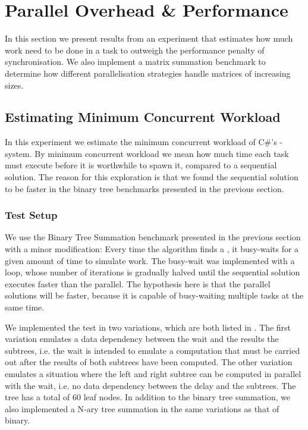 \section{Parallel Overhead \& Performance}\label{sec:crit:work}
In this section we present results from an experiment that estimates how much work need to be done in a task to outweigh the performance penalty of  synchronisation. We also implement a matrix summation benchmark to determine how different parallelisation strategies handle matrices of increasing sizes.

\subsection{Estimating Minimum Concurrent Workload}
In this experiment we estimate the minimum concurrent workload of C\#'s -system. By minimum concurrent workload we mean how much time each task must execute before it is worthwhile to spawn it, compared to a sequential solution. The reason for this exploration is that we found the sequential solution to be faster in the binary tree benchmarks presented in the previous section.

\subsubsection{Test Setup}
We use the Binary Tree Summation benchmark presented in the previous section with a minor modification: Every time the algorithm finds a , it busy-waits for a given amount of time to simulate work. The busy-wait was implemented with a loop, whose number of iterations is gradually halved until the sequential solution executes faster than the parallel. The hypothesis here is that the parallel solutions will be faster, because it is capable of busy-waiting multiple tasks at the same time.

We implemented the test in two variations, which are both listed in . The first variation emulates a data dependency between the wait and the results the subtrees, i.e. the wait is intended to emulate a computation that must be carried out after the results of both subtrees have been computed. The other variation emulates a situation where the left and right subtree can be computed in parallel with the wait, i.e. no data dependency between the delay and the subtrees. The tree has a total of 60 leaf nodes. In addition to the binary tree summation, we also implemented a N-ary tree summation in the same variations as that of binary.

